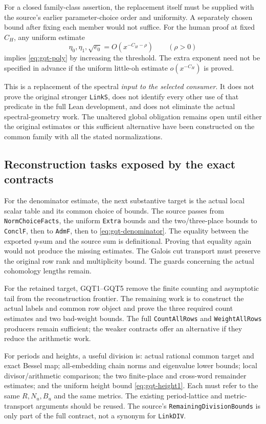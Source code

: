 For a closed family-class assertion, the replacement itself must
be supplied with the source's earlier parameter-choice order and
uniformity. A separately chosen bound after fixing each member
would not suffice. For the human proof at fixed $C_H$, any
uniform estimate
\[
 \eta_0,\eta_1,\sqrt{e_0}=O(x^{-C_H-\rho})\qquad(\rho>0)
\]
implies \eqref{eq:gqt-poly} by increasing the threshold.
The extra exponent need not be specified in advance if the
uniform little-oh estimate $o(x^{-C_H})$ is proved.

This is a replacement of the spectral \emph{input to the selected
consumer}. It does not prove the original stronger
\texttt{LinkS}, does not identify every other use of that
predicate in the full Lean development, and does not eliminate
the actual spectral-geometry work. The unaltered global
obligation remains open until either the original estimates or
this sufficient alternative have been constructed on the common
family with all the stated normalizations.

\subsection{Reconstruction tasks exposed by the exact contracts}

For the denominator estimate, the next substantive target is the
actual local scalar table and its common choice of bounds. The
source passes from \texttt{NormChoiceFacts}, the uniform
\texttt{Extra} bounds and the two/three-place bounds to
\texttt{ConclF}, then to \texttt{AdmF}, then to
\eqref{eq:gqt-denominator}. The equality between the exported
$\eta$-sum and the source sum is definitional. Proving that equality
again would not produce the missing estimates. The Galois cut
transport must preserve the original row rank and multiplicity
bound. The guards concerning the actual cohomology lengths remain.

For the retained target, GQT1--GQT5 remove the finite counting
and asymptotic tail from the reconstruction frontier. The
remaining work is to construct the actual labels and common
row object and prove the three required count estimates and two
bad-weight bounds. The full \texttt{CountAllRows} and
\texttt{WeightAllRows} producers remain sufficient; the weaker
contracts offer an alternative if they reduce the arithmetic work.

For periods and heights, a useful division is: actual rational
common target and exact Bessel map; all-embedding chain norms and
eigenvalue lower bounds; local divisor/arithmetic comparison;
the two finite-place and cross-word remainder estimates; and
the uniform height bound \eqref{eq:gqt-height1}. Each must refer
to the same $R,N_u,B_u$ and the same metrics. The existing
period-lattice and metric-transport arguments should be reused.
The source's \texttt{RemainingDivisionBounds} is only part of
the full contract, not a synonym for \texttt{LinkDIV}.

